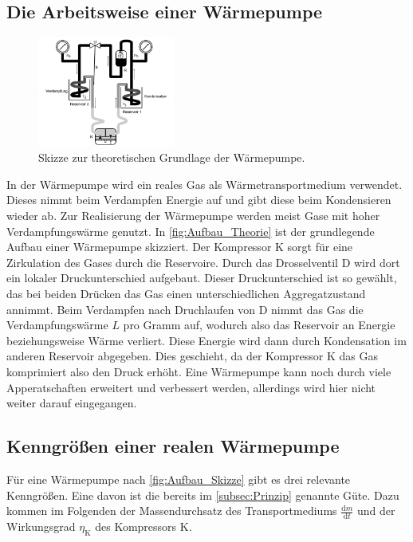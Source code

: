 \subsection{Die Arbeitsweise einer Wärmepumpe}
\label{Arbeitsweise}
\begin{figure}
    \centering
    \includegraphics[width=0.4\textwidth]{content/Ausfbau_Skizze_Theorie.png}
	\caption{Skizze zur theoretischen Grundlage der Wärmepumpe.}
	\label{fig:Aufbau_Theorie}
\end{figure}


In der Wärmepumpe wird ein reales Gas als Wärmetransportmedium verwendet. Dieses nimmt beim Verdampfen Energie auf und gibt diese beim Kondensieren wieder ab. Zur Realisierung der 
Wärmepumpe werden meist Gase mit hoher Verdampfungswärme genutzt. In \autoref{fig:Aufbau_Theorie} ist der grundlegende Aufbau einer Wärmepumpe skizziert. Der Kompressor K sorgt für eine Zirkulation 
des Gases durch die Reservoire. Durch das Drosselventil D wird dort ein lokaler Druckunterschied aufgebaut. Dieser Druckunterschied ist so gewählt, das bei beiden Drücken das Gas
einen unterschiedlichen Aggregatzustand annimmt. Beim Verdampfen nach Druchlaufen von D nimmt das Gas die Verdampfungswärme $L$ pro Gramm auf, wodurch also das Reservoir an Energie 
beziehungsweise Wärme verliert. Diese Energie wird dann durch Kondensation im anderen Reservoir abgegeben. Dies geschieht, da der Kompressor K das Gas komprimiert also den Druck erhöht.
Eine Wärmepumpe kann noch durch viele Apperatschaften erweitert und verbessert werden, allerdings wird hier nicht weiter darauf eingegangen. 

\subsection{Kenngrößen einer realen Wärmepumpe}
\label{subsec:Kenngrößen}

Für eine Wärmepumpe nach \autoref{fig:Aufbau_Skizze} gibt es drei relevante Kenngrößen. Eine davon ist die bereits im \autoref{subsec:Prinzip} genannte Güte. Dazu kommen im
Folgenden der Massendurchsatz des Transportmediums $\frac{\text{d}m}{\text{d}t}$ und der Wirkungsgrad $\eta_{\text{K}}$ des Kompressors K. 


